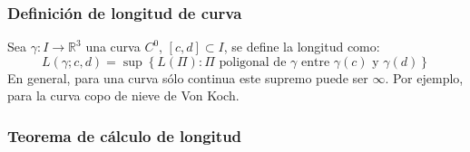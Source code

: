 \documentclass[12pt]{article}
\theoremstyle{plain}
\newcommand{\R}{\mathbb{R}}
\newcommand{\appl}[3]{#1 \colon #2 \longrightarrow #3}
\newcommand{\ds}{\displaystyle}
\newcommand{\tex}[1]{\text{#1}}
\begin{document}
\subsubsection{Definición de longitud de curva}
\begin{defn}
    Sea $\appl{\gamma}{I}{\R^3}$ una curva $C^0$, $\left[c,d\right] \subset  I$, se define la longitud como: \[\ds L(\gamma; c, d)=\sup \left\{L(\Pi) : \Pi\tex{ poligonal de } \gamma \tex{ entre }\gamma(c)\tex{ y }\gamma(d)\right\}\]
    En general, para una curva sólo continua este supremo puede ser $\infty$. Por ejemplo, para la curva copo de nieve de Von Koch.
\end{defn}

\subsubsection{Teorema de cálculo de longitud}
\end{document}
